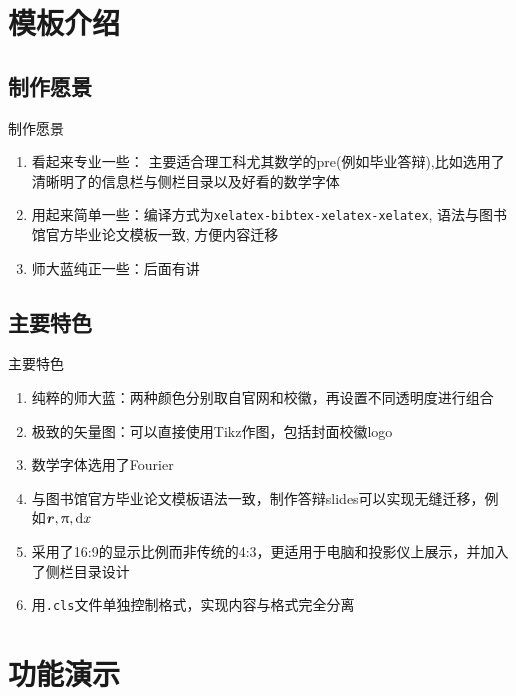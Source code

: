 \documentclass{bnuslides}
\begin{document}
\frame[plain]{\titlepage}

\section{模板介绍}
\subsection{制作愿景}
\begin{frame}{制作愿景}
	\begin{enumerate}
		\item 看起来专业一些： 主要适合理工科尤其数学的pre(例如毕业答辩),比如选用了清晰明了的信息栏与侧栏目录以及好看的数学字体
		\item 用起来简单一些：编译方式为\texttt{xelatex-bibtex-xelatex-xelatex}, 语法与图书馆官方毕业论文模板一致, 方便内容迁移
		\item 师大蓝纯正一些：后面有讲
	\end{enumerate}
\end{frame}

\subsection{主要特色}
\begin{frame}{主要特色}
	\begin{enumerate}
		\item 纯粹的师大蓝：两种颜色分别取自官网和校徽，再设置不同透明度进行组合
		\item 极致的矢量图：可以直接使用Tikz作图，包括封面校徽logo
		\item 数学字体选用了Fourier
		\item 与图书馆官方毕业论文模板语法一致，制作答辩slides可以实现无缝迁移，例如$\symbf{r},\uppi,\dif x$
		\item 采用了16:9的显示比例而非传统的4:3，更适用于电脑和投影仪上展示，并加入了侧栏目录设计
		\item 用\texttt{.cls}文件单独控制格式，实现内容与格式完全分离
	\end{enumerate}
\end{frame}

\section{功能演示}
\end{document}
